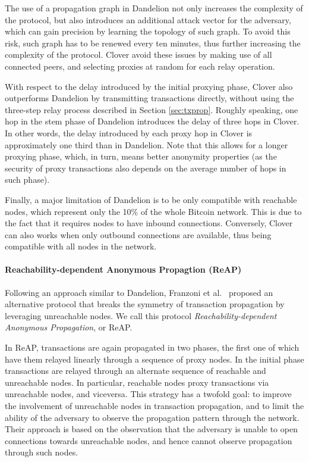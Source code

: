 \documentclass{article}
\begin{document}
	The use of a propagation graph in Dandelion not only increases the complexity of the protocol, but also introduces an additional attack vector for the adversary, which can gain precision by learning the topology of such graph.
	To avoid this risk, such graph has to be renewed every ten minutes, thus further increasing the complexity of the protocol.
	Clover avoid these issues by making use of all connected peers, and selecting proxies at random for each relay operation.
	
	With respect to the delay introduced by the initial proxying phase, Clover also outperforms Dandelion by transmitting transactions directly, without using the three-step relay process described in Section \ref{sec:txprop}.
	Roughly speaking, one hop in the stem phase of Dandelion introduces the delay of three hops in Clover.
	In other words, the delay introduced by each proxy hop in Clover is approximately one third than in Dandelion.
	Note that this allows for a longer proxying phase, which, in turn, means better anonymity properties (as the security of proxy transactions also depends on the average number of hops in such phase).
	
	Finally, a major limitation of Dandelion is to be only compatible with reachable nodes, which represent only the 10\% of the whole Bitcoin network.
	This is due to the fact that it requires nodes to have inbound connections.
	Conversely, Clover can also works when only outbound connections are available, thus being compatible with all nodes in the network.
	
	
	\paragraph{Reachability-dependent Anonymous Propagtion (ReAP)}
	Following an approach similar to Dandelion, Franzoni et al.~\cite{franzoni2020improving} proposed an alternative protocol that breaks the symmetry of transaction propagation by leveraging unreachable nodes.
	We call this protocol \textit{Reachability-dependent Anonymous Propagation}, or ReAP.
	
	In ReAP, transactions are again propagated in two phases, the first one of which have them relayed linearly through a sequence of proxy nodes.
	In the initial phase transactions are relayed through an alternate sequence of reachable and unreachable nodes.
	In particular, reachable nodes proxy transactions via unreachable nodes, and viceversa.
	This strategy has a twofold goal: to improve the involvement of unreachable nodes in transaction propagation, and to limit the ability of the adversary to observe the propagation pattern through the network.
	Their approach is based on the observation that the adversary is unable to open connections towards unreachable nodes, and hence cannot observe propagation through such nodes.
	
\end{document}
